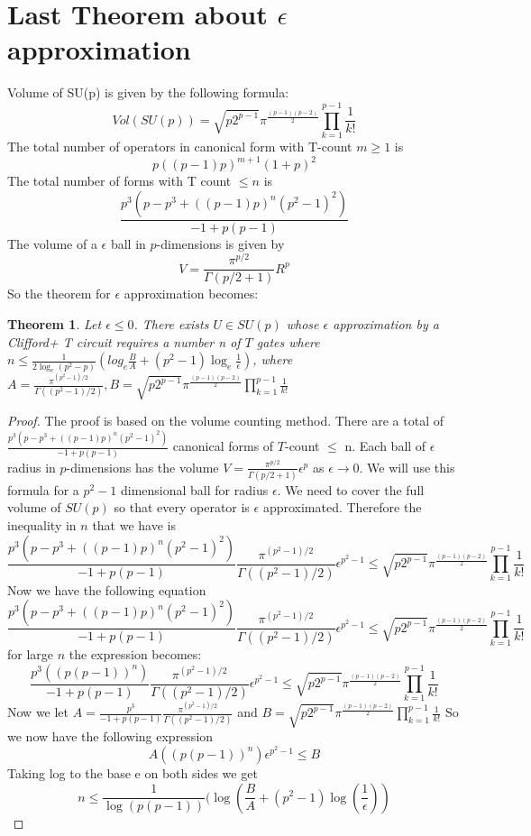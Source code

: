 \documentclass{article}
\newtheorem{theorem}{Theorem}
\begin{document}
\section{Last Theorem about $\epsilon$ approximation}
Volume of SU(p) is given by the following formula\cite{p1}:
\[
Vol(SU(p))=\sqrt{p2^{p-1}}\pi^{\frac{(p-1)(p-2)}{2}}\prod_{k=1}^{p-1}\frac{1}{k!}
\]
The total number of operators in canonical form with T-count $m\geq 1$ is 
\[
p((p-1)p)^{m+1}(1+p)^{2}
\]
The total number of forms with T count $\leq n$ is
\[
\frac{p^{3}(p-p^{3}+((p-1)p)^{n}(p^{2}-1)^{2})
}{-1+p(p-1)}
\]
The volume of a $\epsilon$ ball in $p$-dimensions is given by
\[
V=\frac{\pi^{p/2}}{\Gamma(p/2+1)}R^{p}
\]
So the theorem for $\epsilon$ approximation becomes:
\begin{theorem}
Let $\epsilon \leq 0$. There exists $U \in SU(p)$ whose $\epsilon$ approximation by a Clifford+ T circuit requires a number n of $T$ gates where $n\leq \frac{1}{2\log_{e}(p^{2}-p)}(log_{e}\frac{B}{A}+{(p^{2}-1)}\log_{e}\frac{1}{\epsilon})$, where $A=\frac{\pi^{(p^2-1)/2}}{\Gamma((p^2-1)/2)}, B=\sqrt{p2^{p-1}}\pi^{\frac{(p-1)(p-2)}{2}}\prod_{k=1}^{p-1}\frac{1}{k!}$
\end{theorem}
\begin{proof}
The proof is based on the volume counting method. There are a total of $\frac{p^{3}(p-p^{3}+((p-1)p)^{n}(p^{2}-1)^{2})
}{-1+p(p-1)}$ canonical forms of $T$-count $\leq$ n. Each ball of $\epsilon$ radius in $p$-dimensions has the volume $V=\frac{\pi^{p/2}}{\Gamma(p/2+1)}{\epsilon}^{p}
$ as $\epsilon \to 0$. We will use this formula for a $p^{2}-1$ dimensional ball for radius $\epsilon$. We need to cover the full volume of $SU(p)$ so that every operator is $\epsilon$ approximated. Therefore the inequality in $n$ that we have is 
\[
\frac{p^{3}(p-p^{3}+((p-1)p)^{n}(p^{2}-1)^{2})
}{-1+p(p-1)}\frac{\pi^{(p^2-1)/2}}{\Gamma((p^2-1)/2)}{\epsilon}^{p^{2}-1} \leq \sqrt{p2^{p-1}}\pi^{\frac{(p-1)(p-2)}{2}}\prod_{k=1}^{p-1}\frac{1}{k!}
\]
Now we have the following equation
\[
\frac{p^{3}(p-p^{3}+((p-1)p)^{n}(p^{2}-1)^{2})
}{-1+p(p-1)}\frac{\pi^{(p^2-1)/2}}{\Gamma((p^2-1)/2)}{\epsilon}^{p^{2}-1} \leq \sqrt{p2^{p-1}}\pi^{\frac{(p-1)(p-2)}{2}}\prod_{k=1}^{p-1}\frac{1}{k!}
\]
for large $n$ the expression becomes:
\[
\frac{p^{3}((p(p-1))^{n})}{-1+p(p-1)}\frac{\pi^{(p^2-1)/2}}{\Gamma((p^2-1)/2)}{\epsilon}^{p^{2}-1} \leq \sqrt{p2^{p-1}}\pi^{\frac{(p-1)(p-2)}{2}}\prod_{k=1}^{p-1}\frac{1}{k!}
\]
Now we let $A=\frac{p^{3}}{{-1+p(p-1)}}\frac{\pi^{(p^2-1)/2}}{\Gamma((p^2-1)/2)}$ and $B=\sqrt{p2^{p-1}}\pi^{\frac{(p-1)(p-2)}{2}}\prod_{k=1}^{p-1}\frac{1}{k!}$ So we now have the following expression
\[
A((p(p-1))^{n}){\epsilon}^{p^{2}-1}\leq B
\]
Taking log to the base e on both sides we get
\[
n\leq \frac{1}{\log(p(p-1))}(\log(\frac{B}{A}+(p^{2}-1)\log(\frac{1}{\epsilon}))
\]
\end{proof}
\end{document}
